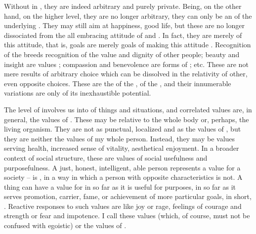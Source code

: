 Without  in , they are indeed arbitrary 
and purely private. Being, on the other hand,  on the 
higher level, they are no longer arbitrary, they can only be an 
 of the underlying . They may still aim at 
 happiness,  good life, but these are no longer 
dissociated from the all embracing attitude of  and 
. In fact, they are merely  of this 
attitude, that is,  goals are merely goals of making this 
attitude . 
Recognition of the  breeds recognition of the value 
and dignity of other people; beauty and insight are values 
 ; compassion and benevolence are forms of 
; etc. These are not mere results of  arbitrary 
choice which can be dissolved in the relativity of other, even opposite 
choices. These are the  of the , of the 
, and their innumerable variations are only 
 of its inexhaustible potential.


\pa \act The level of  involves us into 
of things and situations, and correlated values are, in general, the
values of .  These may be relative to the whole body
or, perhaps, the living organism.  They are not as punctual,
localized and  as the  values of 
, but they are neither the values of my whole person.  Instead,
they may be values serving health, increased sense of vitality, 
aesthetical enjoyment.  In a
broader context of social structure, these are values of social
usefulness and purposefulness.  A just, honest, intelligent, able
 person represents a value for a society -- is ,
in a way in which a person with opposite characteristics is not. A 
thing can have a value for  in so far as it is useful for  
purposes, in so far as it serves  promotion,  carrier, 
 fame, 
or achievement of more particular goals, in short,  
. 
Reactive responses to such values are  like joy or 
 rage, feelings of courage and strength or fear and impotence.
I call these values  (which, of course, must not be 
confused with egoistic) or the values of 
. 


